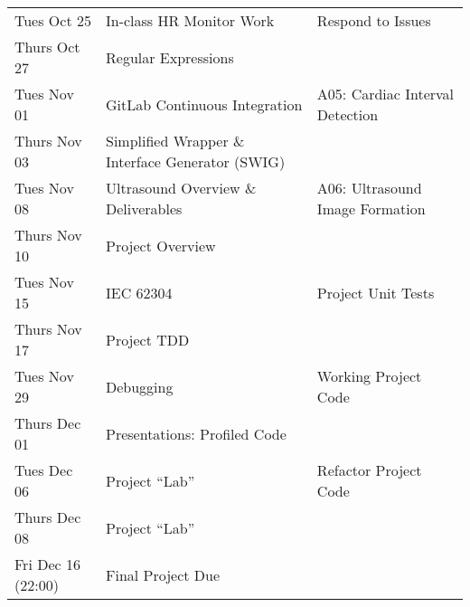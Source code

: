 \begin{longtable}[c]{|l|l|l|}
    \hline
    Tues Oct 25     & In-class HR Monitor Work & Respond to Issues \\
    Thurs Oct 27    & Regular Expressions & \\
    \hline
    Tues Nov 01     & GitLab Continuous Integration & A05: Cardiac Interval Detection \\
    Thurs Nov 03    & Simplified Wrapper \& Interface Generator (SWIG) & \\
    \hline
    Tues Nov 08     & Ultrasound Overview \& Deliverables & A06: Ultrasound Image Formation \\
    Thurs Nov 10    & Project Overview & \\
    \hline
    Tues Nov 15     & IEC 62304 & Project Unit Tests \\
    Thurs Nov 17    & Project TDD & \\
    \hline
    Tues Nov 29     & Debugging & Working Project Code \\
    Thurs Dec 01    & Presentations: Profiled Code & \\
    \hline
    Tues Dec 06     & Project ``Lab'' & Refactor Project Code \\
    Thurs Dec 08    & Project ``Lab'' & \\
    \hline
    Fri Dec 16 (22:00) & Final Project Due  & \\
    \hline

\end{longtable}
